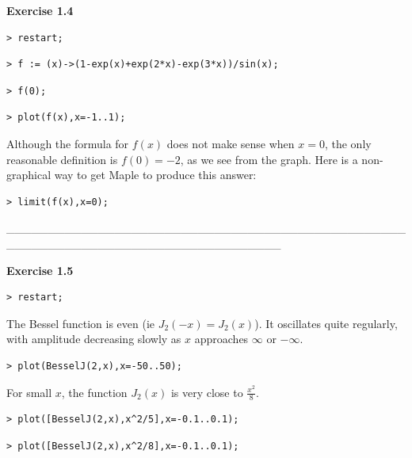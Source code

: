 \documentclass{article}
\begin{document}
\begin{Maple Heading 2}
\textbf{Exercise 1.4}
\end{Maple Heading 2}
\begin{lstlisting}
> restart;
\end{lstlisting}
\begin{lstlisting}
> f := (x)->(1-exp(x)+exp(2*x)-exp(3*x))/sin(x);
\end{lstlisting}
\begin{lstlisting}
> f(0);
\end{lstlisting}
\begin{lstlisting}
> plot(f(x),x=-1..1);
\end{lstlisting}
\begin{Maple Normal}
Although the formula for 
$f (x)$ does not make sense when 
$x =0$, the only reasonable definition is 
$f (0)=-2$, as we see from the graph.  Here is a non-graphical way to get Maple to produce this answer:
\end{Maple Normal}
\begin{lstlisting}
> limit(f(x),x=0);
\end{lstlisting}
\begin{Maple Normal}
\_\_\_\_\_\_\_\_\_\_\_\_\_\_\_\_\_\_\_\_\_\_\_\_\_\_\_\_\_\_\_\_\_\_\_\_\_\_\_\_\_\_\_\_\_\_\_\_\_\_\_\_\_\_\_\_\_\_\_\_\_\_\_\_\_\_\_\_\_\_\_\_\_\_\_\_\_\_\_\_\_
\end{Maple Normal}
\begin{Maple Heading 2}
\textbf{Exercise 1.5}
\end{Maple Heading 2}
\begin{lstlisting}
> restart;
\end{lstlisting}
\begin{Maple Normal}
The Bessel function is even (ie 
$J_{2}(-x)=J_{2}(x)$).  It oscillates quite regularly, with amplitude decreasing slowly as 
$x$ approaches 
$\infty$ or 
$-\infty$.
\end{Maple Normal}
\begin{lstlisting}
> plot(BesselJ(2,x),x=-50..50);
\end{lstlisting}
\begin{Maple Normal}
For small 
$x$, the function 
$J_{2}(x)$ is very close to 
$\frac{x^{2}}{8}$.
\end{Maple Normal}
\begin{lstlisting}
> plot([BesselJ(2,x),x^2/5],x=-0.1..0.1);
\end{lstlisting}
\begin{lstlisting}
> plot([BesselJ(2,x),x^2/8],x=-0.1..0.1);
\end{lstlisting}
\end{document}
